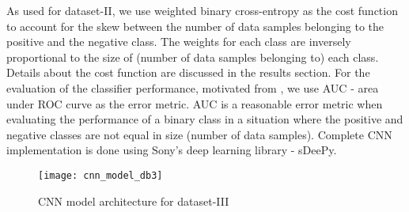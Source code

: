 As used for dataset-II, we use weighted binary cross-entropy as the cost function to account for the skew between the number of data samples belonging to the positive and the negative class. The weights for each class are inversely proportional to the size of (number of data samples belonging to) each class. Details about the cost function are discussed in the results section. For the evaluation of the classifier performance, motivated from \cite{foster2015chime}, we use AUC - area under ROC curve as the error metric. AUC is a reasonable error metric when evaluating the performance of a binary class in a situation where the positive and negative classes are not equal in size (number of data samples). Complete CNN implementation is done using Sony's deep learning library - sDeePy.

\begin{figure}[!htb] 
\centering 
\texttt{[image: cnn\_model\_db3]}
\caption[CNN model architecture for dataset-III]{CNN model architecture for dataset-III}
\label{fig:cnn_model_db3} 
\end{figure}